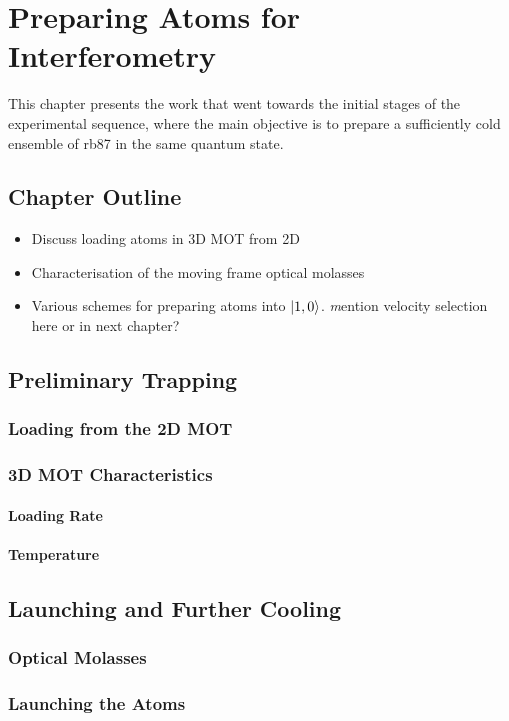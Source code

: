 \chapter{Preparing Atoms for Interferometry}\label{chap:atom_prep}
This chapter presents the work that went towards the initial stages of the experimental sequence, where the main objective is to prepare a sufficiently cold ensemble of \ac{rb87} in the same quantum state.
\section{Chapter Outline}
\begin{itemize}
    \item Discuss loading atoms in 3D MOT from 2D
    \item Characterisation of the moving frame optical molasses
    \item Various schemes for preparing atoms into \(\ket{1,0}\). {\textit mention velocity selection here or in next chapter?}
\end{itemize}
\section{Preliminary Trapping}\label{sec:load_3DMOT}
\subsection{Loading from the 2D MOT}
\subsection{3D MOT Characteristics}
\subsubsection{Loading Rate}
\subsubsection{Temperature}
\section{Launching and Further Cooling}\label{sec:launch_cool}
\subsection{Optical Molasses}
\subsection{Launching the Atoms}
